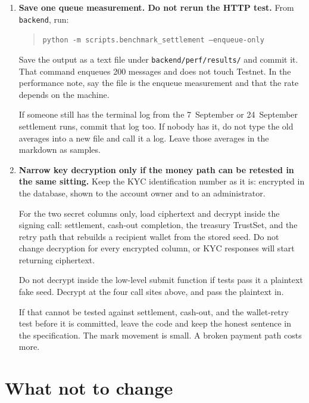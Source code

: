 \documentclass[11pt,a4paper]{article}
\begin{document}
\begin{enumerate}
Do not rewrite the business-problem essay, the competitor percentages, or the diagrams.

\item \textbf{Save one queue measurement. Do not rerun the HTTP test.}
From \texttt{backend}, run:
\begin{quote}
\texttt{python -m scripts.benchmark\_settlement --enqueue-only}
\end{quote}
Save the output as a text file under \texttt{backend/perf/results/} and commit it. That command enqueues 200 messages and does not touch Testnet. In the performance note, say the file is the enqueue measurement and that the rate depends on the machine.

If someone still has the terminal log from the 7~September or 24~September settlement runs, commit that log too. If nobody has it, do not type the old averages into a new file and call it a log. Leave those averages in the markdown as samples.

\item \textbf{Narrow key decryption only if the money path can be retested in the same sitting.}
Keep the KYC identification number as it is: encrypted in the database, shown to the account owner and to an administrator.

For the two secret columns only, load ciphertext and decrypt inside the signing call: settlement, cash-out completion, the treasury TrustSet, and the retry path that rebuilds a recipient wallet from the stored seed. Do not change decryption for every encrypted column, or KYC responses will start returning ciphertext.

Do not decrypt inside the low-level submit function if tests pass it a plaintext fake seed. Decrypt at the four call sites above, and pass the plaintext in.

If that cannot be tested against settlement, cash-out, and the wallet-retry test before it is committed, leave the code and keep the honest sentence in the specification. The mark movement is small. A broken payment path costs more.
\end{enumerate}

\section{What not to change}
\end{document}
